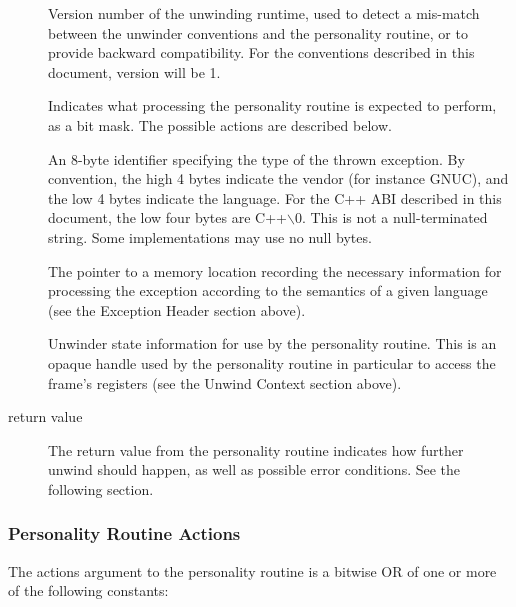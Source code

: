 \begin{description}
\item[] Version number of the unwinding runtime,
   used to detect a mis-match between the unwinder conventions and the
   personality routine, or to provide backward compatibility. For the
   conventions described in this document, version will be 1.
\item[] Indicates what processing the personality routine
   is expected to perform, as a bit mask. The possible actions are
   described below.
\item[] An 8-byte identifier specifying the type of the
   thrown exception. By convention, the high 4 bytes indicate the vendor
   (for instance GNUC), and the low 4 bytes indicate
   the language.  For the C++ ABI described in this document, the low
   four bytes are C++$\backslash$0.  This is not a null-terminated string.
   Some implementations may use no null bytes.
\item[] The pointer to a memory location recording the
   necessary information for processing the exception according to the
   semantics of a given language (see the Exception Header section above).
\item[] Unwinder state information for use by the personality routine.
   This is an opaque handle used by the personality routine in particular
   to access the frame's registers (see the Unwind Context section above).
\item[return value] The return value from the personality routine indicates
   how further unwind should happen, as well as possible error conditions.
   See the following section.
\end{description}

\subsubsection{Personality Routine Actions}

The actions argument to the personality routine is a bitwise OR of one or
more of the following constants: \\

